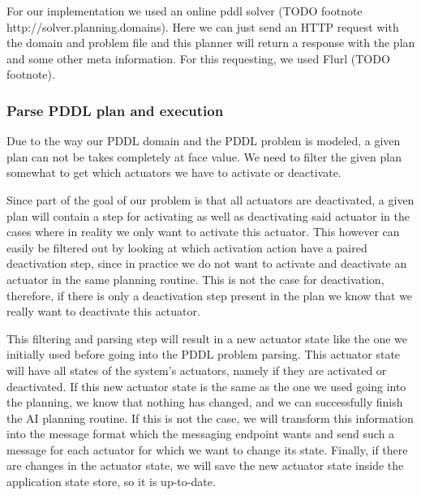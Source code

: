 For our implementation we used an online pddl solver (TODO footnote http://solver.planning.domains). Here we can just send an HTTP request with the domain and problem file and this planner will return a response with the plan and some other meta information. For this requesting, we used Flurl (TODO footnote).

\subsubsection{Parse PDDL plan and execution}
Due to the way our PDDL domain and the PDDL problem is modeled, a given plan can not be takes completely at face value. We need to filter the given plan somewhat to get which actuators we have to activate or deactivate.

Since part of the goal of our problem is that all actuators are deactivated, a given plan will contain a step for activating as well as deactivating said actuator in the cases where in reality we only want to activate this actuator. This however can easily be filtered out by looking at which activation action have a paired deactivation step, since in practice we do not want to activate and deactivate an actuator in the same planning routine. This is not the case for deactivation, therefore, if there is only a deactivation step present in the plan we know that we really want to deactivate this actuator.

This filtering and parsing step will result in a new actuator state like the one we initially used before going into the PDDL problem parsing. This actuator state will have all states of the system's actuators, namely if they are activated or deactivated. If this new actuator state is the same as the one we used going into the planning, we know that nothing has changed, and we can successfully finish the AI planning routine. If this is not the case, we will transform this information into the message format which the messaging endpoint wants and send such a message for each actuator for which we want to change its state. Finally, if there are changes in the actuator state, we will save the new actuator state inside the application state store, so it is up-to-date.
